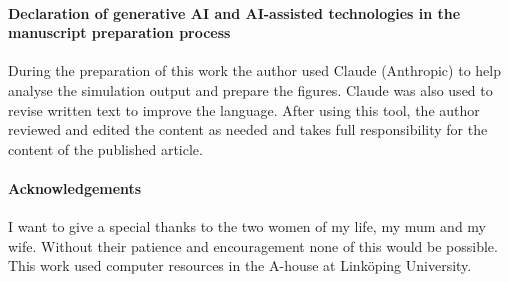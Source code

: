 \documentclass[11pt,a4paper]{article}
\begin{document}
\paragraph*{Declaration of generative AI and AI-assisted technologies in the manuscript preparation process}
During the preparation of this work the author used Claude (Anthropic) to help analyse the simulation output and prepare the figures. Claude was also used to revise written text to improve the language. After using this tool, the author reviewed and edited the content as needed and takes full responsibility for the content of the published article.

\paragraph*{Acknowledgements}
I want to give a special thanks to the two women of my life, my mum and my wife. Without their patience and encouragement none of this would be possible. This work used computer resources in the A-house at Link\"oping University.



\end{document}
